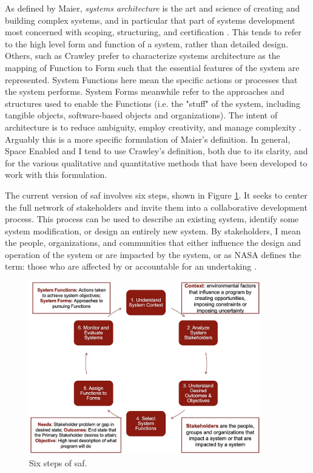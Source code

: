 As defined by Maier, \textit{systems architecture} is the art and science of creating and building complex systems, and in particular that part of systems development most concerned with scoping, structuring, and certification \cite{maierArtSystemsArchitecting2009}. This tends to refer to the high level form and function of a system, rather than detailed design. Others, such as Crawley prefer to characterize systems architecture as the mapping of Function to Form such that the essential features of the system are represented. System Functions here mean the specific actions or processes that the system performs. System Forms meanwhile refer to the approaches and structures used to enable the Functions (i.e. the "stuff" of the system, including tangible objects, software-based objects and organizations). The intent of architecture is to reduce ambiguity, employ creativity, and manage complexity \cite{crawleySystemArchitectureStrategy2015}. Arguably this is a more specific formulation of Maier's definition. In general, Space Enabled and I tend to use Crawley's definition, both due to its clarity, and for the various qualitative and quantitative methods that have been developed to work with this formulation. 

The current version of \ac{saf} involves six steps, shown in Figure \ref{fig:saf}. It seeks to center the full network of stakeholders and invite them into a collaborative development process. This process can be used to describe an existing system, identify some system modification, or design an entirely new system. By stakeholders, I mean the people, organizations, and communities that either influence the design and operation of the system or are impacted by the system, or as NASA defines the term: those who are affected by or accountable for an undertaking \cite{nasaofficeofthechiefengineerNASASystemsEngineering2004}. 

\begin{figure}[!htb] 
\centering
\includegraphics[width=0.9\textwidth]{Figures/chap3/SAF.jpg}
\caption[Six steps of SAF]{Six steps of \ac{saf}.}
\label{fig:saf}
\end{figure}

